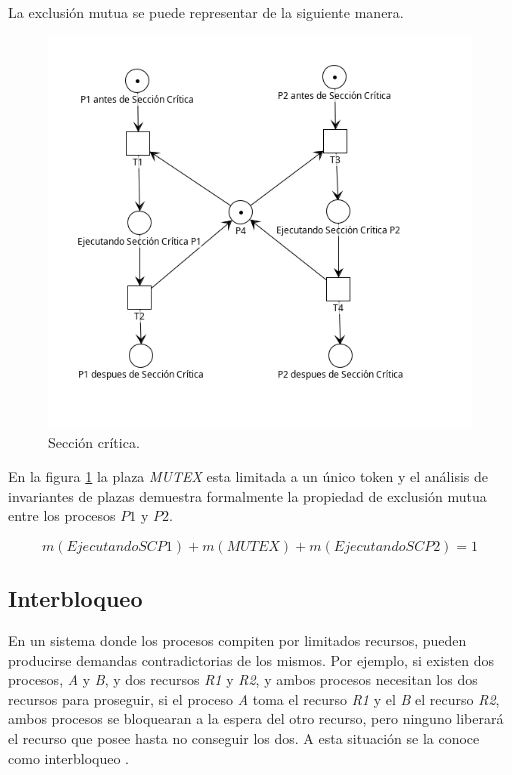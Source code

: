 \noindent La exclusión mutua se puede representar de la siguiente manera.
\begin{figure}[H]
	\centering
	\includegraphics[scale=0.7]{Figures/marco teorico/mutex.png}
	\caption{Sección crítica.}
	\label{fig:exmutuardp}
  \end{figure}

En la figura \ref{fig:exmutuardp} la plaza \textit{MUTEX} esta limitada a un único token y el análisis de invariantes de plazas demuestra formalmente la propiedad de exclusión mutua entre los procesos $P1$ y $P2$. 

\begin{equation}
    m(EjecutandoSCP1) + m(MUTEX) + m(EjecutandoSCP2) = 1
\end{equation}

\subsection{Interbloqueo} \label{sec:Interbloqueo}
En un sistema donde los procesos compiten por limitados recursos, pueden producirse demandas contradictorias de los mismos. Por ejemplo, si existen dos procesos, \textit{A} y \textit{B}, y dos recursos \textit{R1} y \textit{R2}, y ambos procesos necesitan los dos recursos para proseguir, si el proceso \textit{A} toma el recurso \textit{R1} y el \textit{B} el recurso \textit{R2}, ambos procesos se bloquearan a la espera del otro recurso, pero ninguno liberará el recurso que posee hasta no conseguir los dos. A esta situación se la conoce como interbloqueo \cite{stallings}. 

